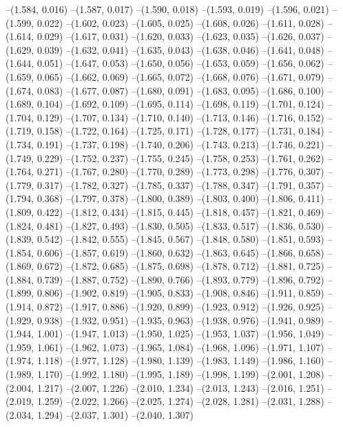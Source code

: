 --(1.584, 0.016)
--(1.587, 0.017)
--(1.590, 0.018)
--(1.593, 0.019)
--(1.596, 0.021)
--(1.599, 0.022)
--(1.602, 0.023)
--(1.605, 0.025)
--(1.608, 0.026)
--(1.611, 0.028)
--(1.614, 0.029)
--(1.617, 0.031)
--(1.620, 0.033)
--(1.623, 0.035)
--(1.626, 0.037)
--(1.629, 0.039)
--(1.632, 0.041)
--(1.635, 0.043)
--(1.638, 0.046)
--(1.641, 0.048)
--(1.644, 0.051)
--(1.647, 0.053)
--(1.650, 0.056)
--(1.653, 0.059)
--(1.656, 0.062)
--(1.659, 0.065)
--(1.662, 0.069)
--(1.665, 0.072)
--(1.668, 0.076)
--(1.671, 0.079)
--(1.674, 0.083)
--(1.677, 0.087)
--(1.680, 0.091)
--(1.683, 0.095)
--(1.686, 0.100)
--(1.689, 0.104)
--(1.692, 0.109)
--(1.695, 0.114)
--(1.698, 0.119)
--(1.701, 0.124)
--(1.704, 0.129)
--(1.707, 0.134)
--(1.710, 0.140)
--(1.713, 0.146)
--(1.716, 0.152)
--(1.719, 0.158)
--(1.722, 0.164)
--(1.725, 0.171)
--(1.728, 0.177)
--(1.731, 0.184)
--(1.734, 0.191)
--(1.737, 0.198)
--(1.740, 0.206)
--(1.743, 0.213)
--(1.746, 0.221)
--(1.749, 0.229)
--(1.752, 0.237)
--(1.755, 0.245)
--(1.758, 0.253)
--(1.761, 0.262)
--(1.764, 0.271)
--(1.767, 0.280)
--(1.770, 0.289)
--(1.773, 0.298)
--(1.776, 0.307)
--(1.779, 0.317)
--(1.782, 0.327)
--(1.785, 0.337)
--(1.788, 0.347)
--(1.791, 0.357)
--(1.794, 0.368)
--(1.797, 0.378)
--(1.800, 0.389)
--(1.803, 0.400)
--(1.806, 0.411)
--(1.809, 0.422)
--(1.812, 0.434)
--(1.815, 0.445)
--(1.818, 0.457)
--(1.821, 0.469)
--(1.824, 0.481)
--(1.827, 0.493)
--(1.830, 0.505)
--(1.833, 0.517)
--(1.836, 0.530)
--(1.839, 0.542)
--(1.842, 0.555)
--(1.845, 0.567)
--(1.848, 0.580)
--(1.851, 0.593)
--(1.854, 0.606)
--(1.857, 0.619)
--(1.860, 0.632)
--(1.863, 0.645)
--(1.866, 0.658)
--(1.869, 0.672)
--(1.872, 0.685)
--(1.875, 0.698)
--(1.878, 0.712)
--(1.881, 0.725)
--(1.884, 0.739)
--(1.887, 0.752)
--(1.890, 0.766)
--(1.893, 0.779)
--(1.896, 0.792)
--(1.899, 0.806)
--(1.902, 0.819)
--(1.905, 0.833)
--(1.908, 0.846)
--(1.911, 0.859)
--(1.914, 0.872)
--(1.917, 0.886)
--(1.920, 0.899)
--(1.923, 0.912)
--(1.926, 0.925)
--(1.929, 0.938)
--(1.932, 0.951)
--(1.935, 0.963)
--(1.938, 0.976)
--(1.941, 0.989)
--(1.944, 1.001)
--(1.947, 1.013)
--(1.950, 1.025)
--(1.953, 1.037)
--(1.956, 1.049)
--(1.959, 1.061)
--(1.962, 1.073)
--(1.965, 1.084)
--(1.968, 1.096)
--(1.971, 1.107)
--(1.974, 1.118)
--(1.977, 1.128)
--(1.980, 1.139)
--(1.983, 1.149)
--(1.986, 1.160)
--(1.989, 1.170)
--(1.992, 1.180)
--(1.995, 1.189)
--(1.998, 1.199)
--(2.001, 1.208)
--(2.004, 1.217)
--(2.007, 1.226)
--(2.010, 1.234)
--(2.013, 1.243)
--(2.016, 1.251)
--(2.019, 1.259)
--(2.022, 1.266)
--(2.025, 1.274)
--(2.028, 1.281)
--(2.031, 1.288)
--(2.034, 1.294)
--(2.037, 1.301)
--(2.040, 1.307)
